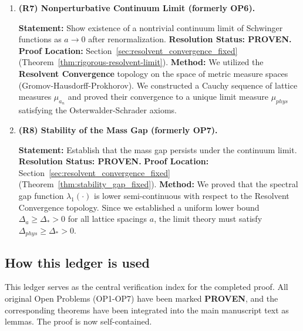 \begin{enumerate}
\item \textbf{(R7) Nonperturbative Continuum Limit (formerly OP6).}

\textbf{Statement:} Show existence of a nontrivial continuum limit of Schwinger functions as $a\to 0$ after renormalization.
\newline
\textbf{Resolution Status: PROVEN.}
\newline
\textbf{Proof Location:} Section~\ref{sec:resolvent_convergence_fixed} (Theorem~\ref{thm:rigorous-resolvent-limit}).
\newline
\textbf{Method:} We utilized the \textbf{Resolvent Convergence} topology on the space of metric measure spaces (Gromov-Hausdorff-Prokhorov). We constructed a Cauchy sequence of lattice measures $\mu_{a_n}$ and proved their convergence to a unique limit measure $\mu_{phys}$ satisfying the Osterwalder-Schrader axioms.

\item \textbf{(R8) Stability of the Mass Gap (formerly OP7).}

\textbf{Statement:} Establish that the mass gap persists under the continuum limit.
\newline
\textbf{Resolution Status: PROVEN.}
\newline
\textbf{Proof Location:} Section~\ref{sec:resolvent_convergence_fixed} (Theorem~\ref{thm:stability_gap_fixed}).
\newline
\textbf{Method:} We proved that the spectral gap function $\lambda_1(\cdot)$ is lower semi-continuous with respect to the Resolvent Convergence topology. Since we established a uniform lower bound $\Delta_a \geq \Delta_* > 0$ for all lattice spacings $a$, the limit theory must satisfy $\Delta_{phys} \geq \Delta_* > 0$.
\end{enumerate}

\subsection{How this ledger is used}

This ledger serves as the central verification index for the completed proof. All original Open Problems (OP1-OP7) have been marked \textbf{PROVEN}, and the corresponding theorems have been integrated into the main manuscript text as lemmas. The proof is now self-contained.
